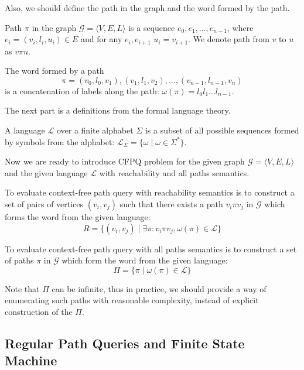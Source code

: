 Also, we should define the path in the graph and the word formed by the path.

\begin{definition}
Path $\pi$ in the graph $\mathcal{G} = \langle V,E,L \rangle$ is a sequence $e_0,e_1,\ldots,e_{n-1}$, where $e_i = (v_i,l_i,u_i) \in E$ and for any $e_i, e_{i+1}$ $u_i = v_{i+1}$. We denote path from $v$ to $u$ as $v\pi u$.
\end{definition}

\begin{definition}
The word formed by a path $$\pi = (v_0,l_0,v_1),(v_1,l_1,v_2),\ldots,(v_{n-1},l_{n-1},v_n)$$ is a concatenation of labels along the path: $\omega(\pi) = l_0 l_1 \ldots l_{n-1}$.
\end{definition}

The next part is a definitions from the formal language theory.
\begin{definition}
A language $\mathcal{L}$ over a finite alphabet $\Sigma$ is a subset of all possible sequences formed by symbols from the alphabet: $\mathcal{L}_{\Sigma} = \{\omega \mid \omega \in \Sigma^*\}$.
\end{definition}

Now we are ready to introduce CFPQ problem for the given graph  $\mathcal{G} = \langle V,E,L \rangle$ and the given language $\mathcal{L}$ with reachability and all paths semantics.

\begin{definition}
To evaluate context-free path query with reachability semantics is to construct a set of pairs of vertices $(v_i,v_j)$ such that there exists a path $v_i \pi v_j$ in $\mathcal{G}$ which forms the word from the given language:
$$
R = \{(v_i,v_j) \mid \exists \pi: v_i \pi v_j, \omega(\pi) \in \mathcal{L} \}
$$
\end{definition}

\begin{definition}
To evaluate context-free path query with all paths semantics is to construct a set of paths $\pi$ in $\mathcal{G}$ which form the word from the given language:
$$
\Pi = \{ \pi \mid \omega(\pi) \in \mathcal{L}\}
$$
\end{definition}

Note that $\Pi$ can be infinite, thus in practice, we should provide a way of enumerating such paths with reasonable complexity, instead of explicit construction of the $\Pi$.

\subsection{Regular Path Queries and Finite State Machine}

